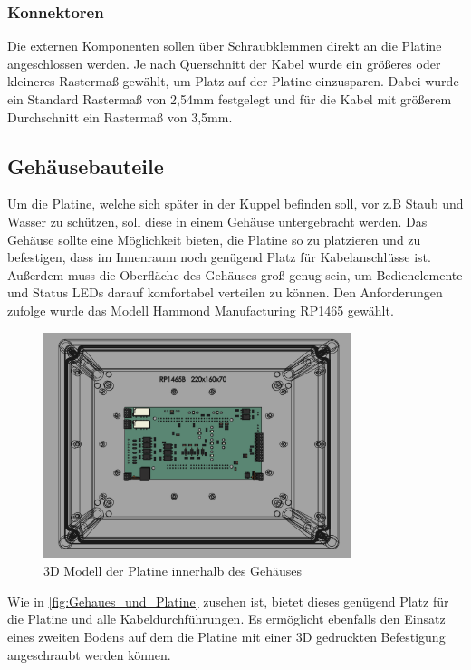 \subsubsection{Konnektoren}
Die externen Komponenten sollen über Schraubklemmen direkt an die Platine angeschlossen werden. Je nach Querschnitt der Kabel wurde ein größeres oder kleineres Rastermaß gewählt, um Platz auf der Platine einzusparen. Dabei wurde ein Standard Rastermaß von 2,54mm festgelegt und für die Kabel mit größerem Durchschnitt ein Rastermaß von 3,5mm.

\subsection{Gehäusebauteile}
Um die Platine, welche sich später in der Kuppel befinden soll, vor z.B Staub und Wasser zu schützen, soll diese in einem Gehäuse untergebracht werden. Das Gehäuse sollte eine Möglichkeit bieten, die Platine so zu platzieren und zu befestigen, dass im Innenraum noch genügend Platz für Kabelanschlüsse ist. Außerdem muss die Oberfläche des Gehäuses groß genug sein, um Bedienelemente und Status LEDs darauf komfortabel verteilen zu können. Den Anforderungen zufolge wurde das Modell Hammond Manufacturing RP1465 gewählt.
\begin{figure}[H]
	\centering
	\includegraphics[width=0.8\textwidth]{images/Hardware/Platine_in_gehause.PNG}
	\caption{3D Modell der Platine innerhalb des Gehäuses}
	\label{fig:Gehaues_und_Platine}
\end{figure}
\noindent Wie in \autoref{fig:Gehaues_und_Platine} zusehen ist, bietet dieses genügend Platz für die Platine und alle Kabeldurchführungen. Es ermöglicht ebenfalls den Einsatz eines zweiten Bodens auf dem die Platine mit einer 3D gedruckten Befestigung angeschraubt werden können.\\

